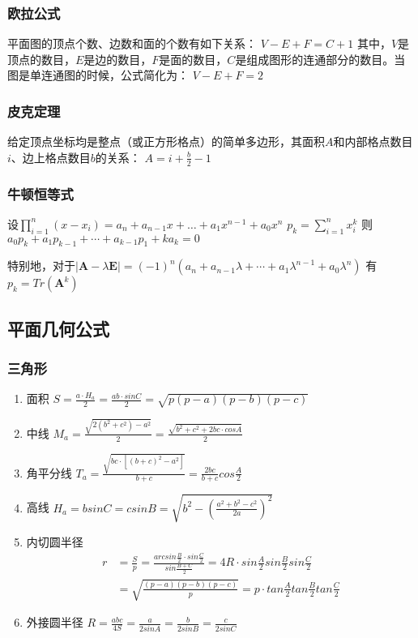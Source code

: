\documentclass[landscape,twocolumn,a4paper]{article}
\begin{document}
	\subsubsection*{欧拉公式}

	平面图的顶点个数、边数和面的个数有如下关系：
	$V - E + F = C+ 1$
	\indent 其中，$V$是顶点的数目，$E$是边的数目，$F$是面的数目，$C$是组成图形的连通部分的数目。当图是单连通图的时候，公式简化为：
	$V - E + F = 2$

	\subsubsection*{皮克定理}

	给定顶点坐标均是整点（或正方形格点）的简单多边形，其面积$A$和内部格点数目$i$、边上格点数目$b$的关系：
	$A = i + \frac{b}{2} - 1$

	\subsubsection*{牛顿恒等式}

	设$\prod_{i = 1}^n{(x - x_i)} = a_n + a_{n - 1} x + \dots + a_1 x^{n - 1} + a_0 x^n$
	$p_k = \sum_{i = 1}^n{x_i^k}$
	则$a_0 p_k + a_1 p_{k - 1} + \cdots + a_{k - 1} p_1 + k a_k = 0$

	特别地，对于$|\bm{A} - \lambda \bm{E}| = (-1)^n(a_n + a_{n - 1} \lambda + \cdots + a_1 \lambda^{n - 1} + a_0 \lambda^n)$
	有$p_k = Tr(\bm{A}^k)$


	\subsection{平面几何公式}

	\subsubsection*{三角形}

	\begin{enumerate}
		\item 面积
		$S=\frac{a \cdot H_a}{2}=\frac{ab \cdot sinC}{2}=\sqrt{p(p-a)(p-b)(p-c)}$
		\item 中线
		$M_a=\frac{\sqrt{2(b^2+c^2)-a^2}}{2}=\frac{\sqrt{b^2+c^2+2bc \cdot cosA}}{2}$
		\item 角平分线
		$T_a=\frac{\sqrt{bc \cdot [(b+c)^2-a^2]}}{b+c}=\frac{2bc}{b+c}cos\frac{A}{2}$
		\item 高线
		$H_a=bsinC=csinB=\sqrt{b^2-(\frac{a^2+b^2-c^2}{2a})^2}$
		\item 内切圆半径
		\begin{align*}
		r&=\frac{S}{p}=\frac{arcsin\frac{B}{2} \cdot sin\frac{C}{2}}{sin\frac{B+C}{2}}=4R \cdot sin\frac{A}{2}sin\frac{B}{2}sin\frac{C}{2}\\
		&=\sqrt{\frac{(p-a)(p-b)(p-c)}{p}}=p \cdot tan\frac{A}{2}tan\frac{B}{2}tan\frac{C}{2}
		\end{align*}
		\item 外接圆半径
		$R=\frac{abc}{4S}=\frac{a}{2sinA}=\frac{b}{2sinB}=\frac{c}{2sinC}$
	\end{enumerate}
\end{document}
